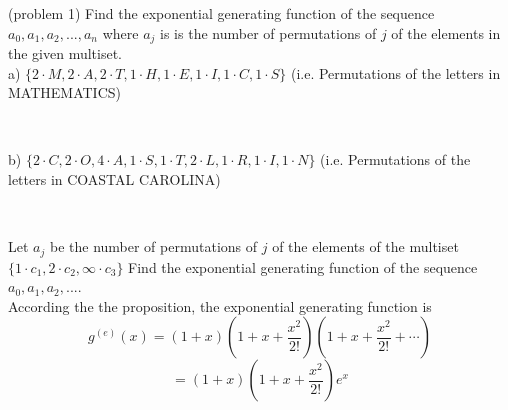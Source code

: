\documentclass[handout]{ximera}
\begin{document}
\begin{problem}(problem 1)
Find the exponential generating function of the sequence $a_0, a_1, a_2, ..., a_{n}$ where $a_j$ is is the number of 
permutations of $j$ of the elements in the given multiset.\\
a) $\{2\cdot M, 2\cdot A, 2 \cdot T, 1\cdot H, 1\cdot E, 1\cdot I, 1\cdot C, 1\cdot S\}$ (i.e. Permutations of the letters in MATHEMATICS)
\begin{multipleChoice}
\\
\end{multipleChoice}



b) $\{2\cdot C, 2\cdot O, 4\cdot A, 1\cdot S, 1\cdot T, 2\cdot L, 1\cdot R, 1\cdot I, 1\cdot N\}$ 
(i.e. Permutations of the letters in COASTAL CAROLINA)
\begin{multipleChoice}
\\
\end{multipleChoice}

\end{problem}




\begin{example}[example 2]
Let $a_j$ be the number of permutations of $j$ of the elements of the multiset $\{1 \cdot c_1, 2 \cdot c_2, \infty \cdot c_3\}$
Find the exponential generating function of the sequence $a_0, a_1, a_2, ...$.\\
According the the proposition, the exponential generating function is
\[
g^{(e)}(x) = (1+x)\left(1 + x + \frac{x^2}{2!}\right)\left(1 + x + \frac{x^2}{2!} + \cdots \right)
\]
\[
= (1+x)\left(1 + x + \frac{x^2}{2!}\right)e^x
\]
\end{example}
\end{document}
